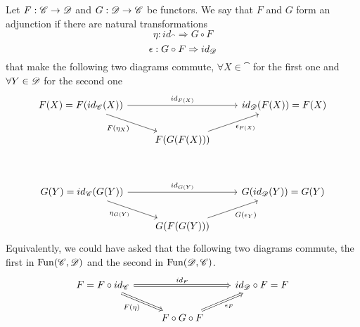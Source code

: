 \begin{defn}[Adjunction]\label{AdjFun}
    Let $F:\mathscr{C}\to\mathscr{D}$ and $G:\mathscr{D}\to\mathscr{C}$ be functors. We say that $F$ and $G$ form an adjunction if there are natural transformations $$\eta:id_{\cat}\Rightarrow G\circ F$$
    $$\epsilon:G\circ F\Rightarrow id_{\mathscr{D}}$$
    that make the following two diagrams commute, $\forall X\in\cat$ for the first one and $\forall Y\in\mathscr{D}$ for the second one 
    \[\begin{tikzcd}
        {F(X)= F(id_{\cat}(X))} && {id_\dat(F(X))= F(X)} \\
        & {F(G(F(X)))} \\
        \arrow["{F(\eta_X)}"', from=1-1, to=2-2]
        \arrow["{\epsilon_{F(X)}}"', from=2-2, to=1-3]
        \arrow["{id_{F(X)}}", from=1-1, to=1-3]
    \end{tikzcd}\]
    \[\begin{tikzcd}
        {G(Y)= id_\cat(G(Y))} && {G(id_\dat(Y))= G(Y)} \\
        & {G(F(G(Y)))}
        \arrow["{\eta_{G(Y)}}"', from=1-1, to=2-2]
        \arrow["{G(\epsilon_{Y})}"', from=2-2, to=1-3]
        \arrow["{id_{G(Y)}}", from=1-1, to=1-3]
    \end{tikzcd}\]
    Equivalently, we could have asked that the following two diagrams commute, the first in $\operatorname{Fun}(\mathscr{C},\mathscr{D})$ and the second in $\operatorname{Fun}(\mathscr{D},\mathscr{C})$.
    \[\begin{tikzcd}
        {F= F\circ id_{\cat}} && {id_\dat\circ F= F} \\
        & {F\circ G\circ F} \\
        \arrow["{F(\eta)}"', Rightarrow, from=1-1, to=2-2]
        \arrow["{\epsilon_{F}}"', Rightarrow, from=2-2, to=1-3]
        \arrow["{id_F}", Rightarrow, from=1-1, to=1-3]

\end{tikzcd}\]
\end{defn}
